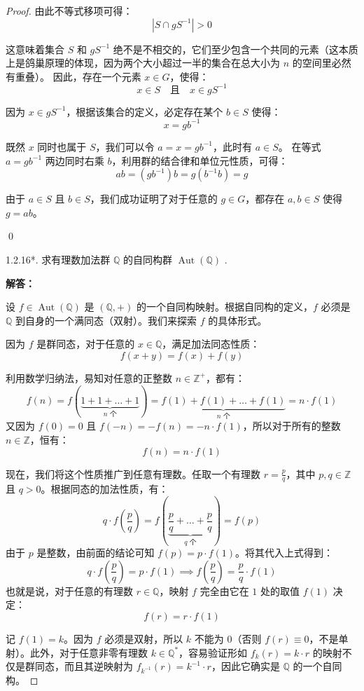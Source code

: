 \documentclass[]{article}
\begin{document}
\begin{proof}
由此不等式移项可得：
\[ |S \cap gS^{-1}| > 0 \]

这意味着集合 $S$ 和 $gS^{-1}$ 绝不是不相交的，它们至少包含一个共同的元素（这本质上是鸽巢原理的体现，因为两个大小超过一半的集合在总大小为 $n$ 的空间里必然有重叠）。
因此，存在一个元素 $x \in G$，使得：
\[ x \in S \quad \text{且} \quad x \in gS^{-1} \]

因为 $x \in gS^{-1}$，根据该集合的定义，必定存在某个 $b \in S$ 使得：
\[ x = gb^{-1} \]

既然 $x$ 同时也属于 $S$，我们可以令 $a = x = gb^{-1}$，此时有 $a \in S$。
在等式 $a = gb^{-1}$ 两边同时右乘 $b$，利用群的结合律和单位元性质，可得：
\[ ab = (gb^{-1})b = g(b^{-1}b) = g \]

由于 $a \in S$ 且 $b \in S$，我们成功证明了对于任意的 $g \in G$，都存在 $a, b \in S$ 使得 $g = ab$。

\qed

1.2.16*. 求有理数加法群 $\mathbb{Q}$ 的自同构群 $\operatorname{Aut}(\mathbb{Q})$ . 

\bigskip
\noindent \textbf{解答：} 

设 $f \in \operatorname{Aut}(\mathbb{Q})$ 是 $(\mathbb{Q}, +)$ 的一个自同构映射。根据自同构的定义，$f$ 必须是 $\mathbb{Q}$ 到自身的一个满同态（双射）。我们来探索 $f$ 的具体形式。

因为 $f$ 是群同态，对于任意的 $x \in \mathbb{Q}$，满足加法同态性质：
\[ f(x + y) = f(x) + f(y) \]

利用数学归纳法，易知对任意的正整数 $n \in \mathbb{Z}^+$，都有：
\[ f(n) = f(\underbrace{1 + 1 + \dots + 1}_{n \text{ 个}}) = \underbrace{f(1) + f(1) + \dots + f(1)}_{n \text{ 个}} = n \cdot f(1) \]
又因为 $f(0) = 0$ 且 $f(-n) = -f(n) = -n \cdot f(1)$，所以对于所有的整数 $n \in \mathbb{Z}$，恒有：
\[ f(n) = n \cdot f(1) \]

现在，我们将这个性质推广到任意有理数。任取一个有理数 $r = \frac{p}{q}$，其中 $p, q \in \mathbb{Z}$ 且 $q > 0$。根据同态的加法性质，有：
\[ q \cdot f\left(\frac{p}{q}\right) = f\left( \underbrace{\frac{p}{q} + \dots + \frac{p}{q}}_{q \text{ 个}} \right) = f(p) \]
由于 $p$ 是整数，由前面的结论可知 $f(p) = p \cdot f(1)$。将其代入上式得到：
\[ q \cdot f\left(\frac{p}{q}\right) = p \cdot f(1) \implies f\left(\frac{p}{q}\right) = \frac{p}{q} \cdot f(1) \]
也就是说，对于任意的有理数 $r \in \mathbb{Q}$，映射 $f$ 完全由它在 $1$ 处的取值 $f(1)$ 决定：
\[ f(r) = r \cdot f(1) \]

记 $f(1) = k$。因为 $f$ 必须是双射，所以 $k$ 不能为 $0$（否则 $f(r) \equiv 0$，不是单射）。此外，对于任意非零有理数 $k \in \mathbb{Q}^*$，容易验证形如 $f_k(r) = k \cdot r$ 的映射不仅是群同态，而且其逆映射为 $f_{k^{-1}}(r) = k^{-1} \cdot r$，因此它确实是 $\mathbb{Q}$ 的一个自同构。


\end{proof}
\end{document}
